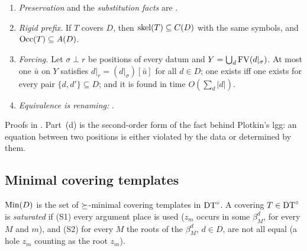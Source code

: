 \begin{lemma}\label{lem:single:basic}
\leavevmode
\begin{enumerate}[label=(\alph*)]
\item[(a), (b)] \emph{Preservation} and the \emph{substitution facts} are .
\setcounter{enumi}{2}
\item \emph{Rigid prefix.} If $T$ covers $D$, then $\mathrm{skel}(T)\subseteq C(D)$ with the same symbols, and $\mathrm{Occ}(T)\subseteq A(D)$.
\item \emph{Forcing.} Let $\sigma\perp r$ be positions of every datum and $Y=\bigcup_d\mathrm{FV}(d|_\sigma)$. At most one $\bar u$ on $Y$ satisfies $d|_r=(d|_\sigma)[\bar u]$ for all $d\in D$; one exists iff one exists for every pair $\{d,d'\}\subseteq D$; and it is found in time $O(\sum_d|d|)$.
\item \emph{Equivalence is renaming:} .
\end{enumerate}
\end{lemma}

\noindent Proofs in . Part~(d) is the second-order form of the fact behind Plotkin's lgg: an equation between two positions is either violated by the data or determined by them.

\subsection{Minimal covering templates}\label{sec:single:min}

$\mathrm{Min}(D)$ is the set of $\succeq$-minimal covering templates in $\mathrm{DT}^{\circ}$. A covering $T\in\mathrm{DT}^{\circ}$ is \emph{saturated} if (S1) every argument place is used ($z_m$ occurs in some $\beta^d_M$, for every $M$ and $m$), and (S2) for every $M$ the roots of the $\beta^d_M$, $d\in D$, are not all equal (a hole $z_m$ counting as the root $z_m$).


